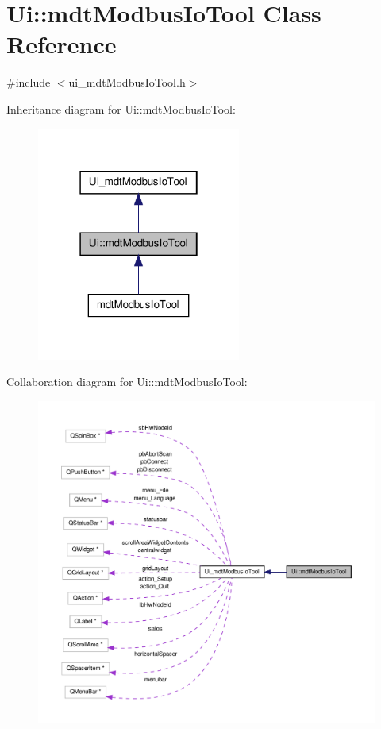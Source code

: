 \hypertarget{class_ui_1_1mdt_modbus_io_tool}{\section{Ui\-:\-:mdt\-Modbus\-Io\-Tool Class Reference}
\label{class_ui_1_1mdt_modbus_io_tool}
}


{\ttfamily \#include $<$ui\-\_\-mdt\-Modbus\-Io\-Tool.\-h$>$}



Inheritance diagram for Ui\-:\-:mdt\-Modbus\-Io\-Tool\-:
\nopagebreak
\begin{figure}[H]
\begin{center}
\leavevmode
\includegraphics[width=190pt]{class_ui_1_1mdt_modbus_io_tool__inherit__graph}
\end{center}
\end{figure}


Collaboration diagram for Ui\-:\-:mdt\-Modbus\-Io\-Tool\-:
\nopagebreak
\begin{figure}[H]
\begin{center}
\leavevmode
\includegraphics[width=350pt]{class_ui_1_1mdt_modbus_io_tool__coll__graph}
\end{center}
\end{figure}
